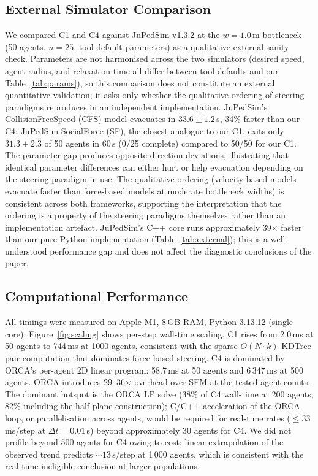 \documentclass[a4paper,twoside]{article}
\begin{document}
\subsection{External Simulator Comparison}
\label{sec:external}

We compared C1 and C4 against JuPedSim v1.3.2 at the $w=1.0$\,m bottleneck (50 agents, $n=25$, tool-default parameters) as a qualitative external sanity check. Parameters are not harmonised across the two simulators (desired speed, agent radius, and relaxation time all differ between tool defaults and our Table~\ref{tab:params}), so this comparison does not constitute an external quantitative validation; it asks only whether the qualitative ordering of steering paradigms reproduces in an independent implementation. JuPedSim's CollisionFreeSpeed (CFS) model evacuates in $33.6\!\pm\!1.2$\,s, 34\% faster than our C4; JuPedSim SocialForce (SF), the closest analogue to our C1, exits only $31.3\!\pm\!2.3$ of 50 agents in 60\,s (0/25 complete) compared to 50/50 for our C1. The parameter gap produces opposite-direction deviations, illustrating that identical parameter differences can either hurt or help evacuation depending on the steering paradigm in use. The qualitative ordering (velocity-based models evacuate faster than force-based models at moderate bottleneck widths) is consistent across both frameworks, supporting the interpretation that the ordering is a property of the steering paradigms themselves rather than an implementation artefact. JuPedSim's C++ core runs approximately 39$\times$ faster than our pure-Python implementation (Table~\ref{tab:external}); this is a well-understood performance gap and does not affect the diagnostic conclusions of the paper.



\subsection{Computational Performance}
\label{sec:scaling-eval}

All timings were measured on Apple M1, 8\,GB RAM, Python 3.13.12 (single core). Figure~\ref{fig:scaling} shows per-step wall-time scaling. C1 rises from 2.0\,ms at 50 agents to 744\,ms at 1000 agents, consistent with the sparse $O(N{\cdot}k)$ KDTree pair computation that dominates force-based steering. C4 is dominated by ORCA's per-agent 2D linear program: 58.7\,ms at 50 agents and 6\,347\,ms at 500 agents. ORCA introduces 29--36$\times$ overhead over SFM at the tested agent counts. The dominant hotspot is the ORCA LP solve (38\% of C4 wall-time at 200 agents; 82\% including the half-plane construction); C/C++ acceleration of the ORCA loop, or parallelisation across agents, would be required for real-time rates ($\le 33$\,ms/step at $\Delta t=0.01$\,s) beyond approximately 30 agents for C4. We did not profile beyond 500 agents for C4 owing to cost; linear extrapolation of the observed trend predicts $\sim\!13$\,s/step at 1\,000 agents, which is consistent with the real-time-ineligible conclusion at larger populations.
\end{document}
